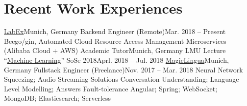 \section{\textbf{Recent Work Experiences}}
  \resumeSubHeadingListStart
    \resumeSubheading
      {\href{https://labex.io/}{LabEx}}{Munich, Germany}
      {Backend Engineer (Remote)}{Mar. 2018 -- Present}
      \resumeItemListStart
          {Beego/gin, Automated Cloud Resource Access Management Microservices (Alibaba Cloud + AWS)}
      \resumeItemListEnd
    \resumeSubheading
      {Academic Tutor}{Munich, Germany}
      {LMU Lecture ``\href{http://www.dbs.ifi.lmu.de/cms/studium_lehre/lehre_master/ml18/index.html}{Machine Learning}'' SoSe 2018}{Aprl. 2018 -- Jul. 2018}
    \resumeSubheading
    {\href{https://magiclingua.com/}{MagicLingua}}{Munich, Germany}
    {Fullstack Engineer (Freelance)}{Nov. 2017 -- Mar. 2018}
    \resumeItemListStart
        {Neural Network Squeezing; Audio Streaming Solutions}
        {Conversation Understanding; Language Level Modelling; Answers Fault-tolerance}
        {Angular; Spring; WebSocket; MongoDB; Elasticsearch; Serverless}
    \resumeItemListEnd
  \resumeSubHeadingListEnd